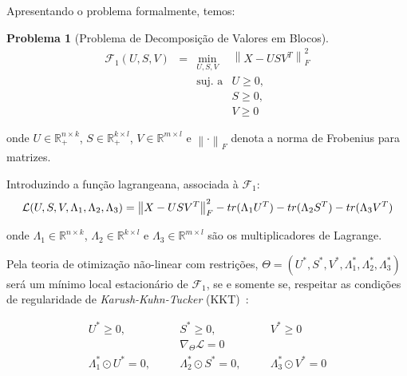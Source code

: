 \documentclass[
    12pt,                %
    oneside,            %
    a4paper,            %
    english,            %
    brazil                %
    ]{abntex2ppgsi}
\newtheorem{problem}{Problema}
\newcommand{\norm}[1]{\left\lVert#1\right\rVert}
\begin{document}
Apresentando o problema formalmente, temos:

\begin{problem}[Problema de Decomposição de Valores em Blocos]
\label{def:bvd:problem}
\begin{equation}
    \begin{array}{lclcl}
        \displaystyle \mathcal{F}_1(U, S, V) & = & \displaystyle \min_{U, S, V} & \norm{X - USV^T}^{2}_{F} \\
                                           &   & \text{suj. a}                & U \geq 0,                \\
                                           &   &                              & S \geq 0,                \\
                                           &   &                              & V \geq 0
    \end{array}
\end{equation}
\end{problem}

onde $U \in \mathbb{R}^{n \times k}_{+}$, $S \in \mathbb{R}^{k \times l}_{+}$, $V \in \mathbb{R}^{m \times l}$ e $\norm{\cdot}_F$ denota a norma de Frobenius para matrizes.

Introduzindo a função lagrangeana, associada à $\mathcal{F}_1$:
\[
    \displaystyle \mathcal{L}(U, S, V, \Lambda_1, \Lambda_2, \Lambda_3) = \norm{X - USV^T}^{2}_{F} - tr(\Lambda_1 U^T) - tr(\Lambda_2 S^T) - tr(\Lambda_3 V^T) \\
\]

onde $\Lambda_1 \in \mathbb{R}^{n \times k}$, $\Lambda_2 \in \mathbb{R}^{k \times l}$ e $\Lambda_3 \in \mathbb{R}^{m \times l}$ são os multiplicadores de Lagrange.

Pela teoria de otimização não-linear com restrições, $\Theta = (U^{*}, S^{*}, V^{*}, \Lambda_{1}^*, \Lambda_{2}^*, \Lambda_{3}^*)$ será um mínimo local estacionário de $\mathcal{F}_1$, se e somente se, respeitar as condições de regularidade de \textit{Karush-Kuhn-Tucker} (KKT)~\cite{bazaraa2006}:

\begin{subequations}
    \begin{alignat}{3}
        U^* \geq 0, \quad                  && S^* \geq 0, \quad                     && V^* \geq 0                  \label{eq:bvd:kkt1} \\
        \quad                              && \nabla_{\Theta} \mathcal{L} = 0 \quad &&                             \label{eq:bvd:kkt2} \\
        \Lambda_{1}^* \odot U^* = 0, \quad && \Lambda_{2}^* \odot S^* = 0, \quad    && \Lambda_{3}^* \odot V^* = 0 \label{eq:bvd:kkt3}
    \end{alignat}
\end{subequations}
\end{document}
